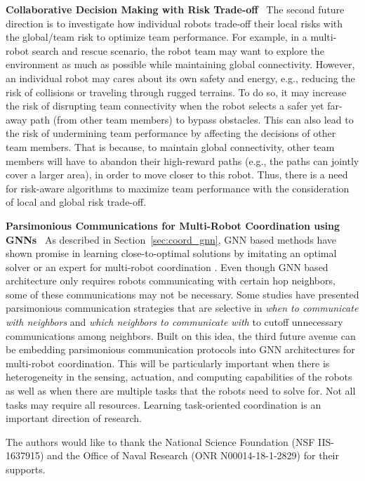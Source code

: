 \noindent\textbf{Collaborative Decision Making with Risk Trade-off  
} ~The second future direction is to investigate how individual robots trade-off their local risks with the global/team risk to optimize team performance. For example, in a multi-robot search and rescue scenario, the robot team may want to explore the environment as much as possible while maintaining global connectivity. However, an individual robot may cares about its own safety and energy, e.g., reducing the risk of collisions or traveling through rugged terrains. To do so, it may increase the risk of disrupting team connectivity when the robot selects a safer yet far-away path (from other team members) to bypass obstacles. This can also lead to the risk of undermining team performance by affecting the decisions of other team members. That is because, to maintain global connectivity, other team members will have to abandon their high-reward paths (e.g., the paths can jointly cover a larger area), in order to move closer to this robot. Thus, there is a need for risk-aware algorithms to maximize team performance with the consideration of local and global risk trade-off.

\noindent\textbf{Parsimonious Communications for Multi-Robot Coordination using GNNs} ~As described in Section~\ref{sec:coord_gnn}, GNN based methods have shown promise in learning close-to-optimal solutions by imitating an optimal solver or an expert for multi-robot coordination \cite{tolstaya2020learning,li2019graph,wang2020learning}.
Even though GNN based architecture only requires robots communicating with certain hop neighbors, some of these communications may not be necessary. Some studies have presented parsimonious communication strategies that are selective in \textit{when to communicate with neighbors} \cite{zhou2017active,zhou2018active,liu2020when2com} and \textit{which neighbors to communicate with} \cite{liu2020who2com} to cutoff unnecessary communications among neighbors. Built on this idea, the third future avenue can be embedding parsimonious communication protocols into GNN architectures for multi-robot coordination. This will be particularly important when there is heterogeneity in the sensing, actuation, and computing capabilities of the robots as well as when there are multiple tasks that the robots need to solve for. Not all tasks may require all resources. Learning task-oriented coordination is an important direction of research.


\begin{acknowledgements}
The authors would like to thank the National Science
Foundation (NSF IIS-1637915) and the Office of Naval Research (ONR N00014-18-1-2829) for their supports.
\end{acknowledgements}

